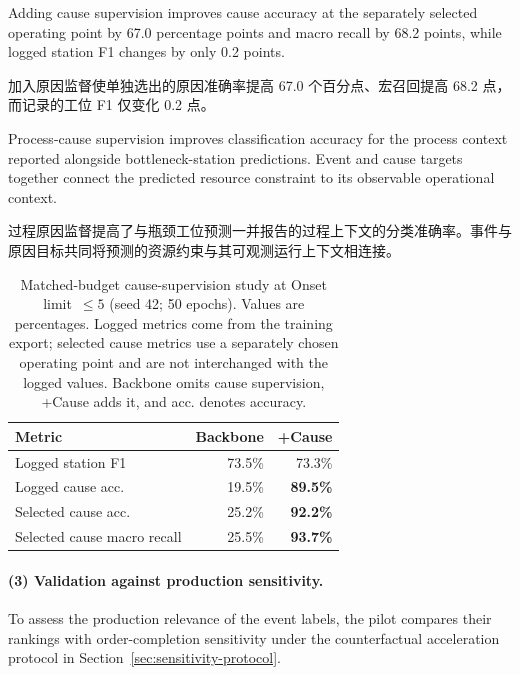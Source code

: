 \documentclass[a4paper,fleqn]{cas-dc}
\newcommand{\zhpara}[1]{%
  \par\begingroup\small\color{black!72}\noindent #1\par\endgroup}
\begin{document}
Adding cause supervision improves cause accuracy at the separately selected operating point by 67.0 percentage points and macro recall by 68.2 points, while logged station F1 changes by only 0.2 points.

\zhpara{加入原因监督使单独选出的原因准确率提高 67.0 个百分点、宏召回提高 68.2 点，而记录的工位 F1 仅变化 0.2 点。}


Process-cause supervision improves classification accuracy for the process context reported alongside bottleneck-station predictions. Event and cause targets together connect the predicted resource constraint to its observable operational context.

\zhpara{过程原因监督提高了与瓶颈工位预测一并报告的过程上下文的分类准确率。事件与原因目标共同将预测的资源约束与其可观测运行上下文相连接。}


\begin{table}[pos=!htbp]
\centering
\caption{Matched-budget cause-supervision study at Onset limit~$\leq5$ (seed 42; 50 epochs). Values are percentages. Logged metrics come from the training export; selected cause metrics use a separately chosen operating point and are not interchanged with the logged values. Backbone omits cause supervision, +Cause adds it, and acc. denotes accuracy.}
\label{tab:matched-cause}
\scriptsize
\setlength{\tabcolsep}{3.5pt}
\renewcommand{\arraystretch}{1.08}
\begin{tabular*}{\columnwidth}{@{\extracolsep{\fill}}lrr@{}}
\toprule
Metric & Backbone & +Cause \\
\midrule
Logged station F1 & 73.5\% & 73.3\% \\
Logged cause acc. & 19.5\% & \textbf{89.5\%} \\
Selected cause acc. & 25.2\% & \textbf{92.2\%} \\
Selected cause macro recall & 25.5\% & \textbf{93.7\%} \\
\bottomrule
\end{tabular*}
\end{table}

\paragraph*{(3) Validation against production sensitivity.}
To assess the production relevance of the event labels, the pilot compares their rankings with order-completion sensitivity under the counterfactual acceleration protocol in Section~\ref{sec:sensitivity-protocol}.
\end{document}
